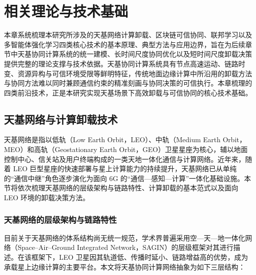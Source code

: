 \chapter{相关理论与技术基础}
\label{chap:ch2_background}

本章系统梳理本研究所涉及的天基网络计算卸载、区块链可信协同、联邦学习以及多智能体强化学习四类核心技术的基本原理、典型方法与应用边界，旨在为后续章节中天基协同计算系统的统一建模、长时间尺度协同优化以及短时间尺度卸载决策提供完整的理论支撑与技术依据。天基协同计算系统具有节点高速运动、链路时变、资源异构与可信环境受限等鲜明特征，传统地面边缘计算中所沿用的卸载方法与协同方法难以同时兼顾通信约束的精准刻画与协同决策的可信执行。本章梳理的四类前沿技术，正是本研究实现天基场景下高效卸载与可信协同的核心技术基础。

\section{天基网络与计算卸载技术}
\label{sec:ch2_satellite_offloading}

天基网络是指以低轨（Low Earth Orbit，LEO）、中轨（Medium Earth Orbit，MEO）和高轨（Geostationary Earth Orbit，GEO）卫星星座为核心，辅以地面控制中心、信关站及用户终端构成的一类天地一体化通信与计算网络。近年来，随着 LEO 巨型星座的快速部署与星上计算能力的持续提升，天基网络已从单纯的“通信中继”角色逐步演化为面向 6G 的“通信—感知—计算”一体化基础设施\cite{He2021,Wu2024ISL,Wang2024NTN,Saad2024NTNRel1718,Mahboob2024AINTN,Wang2025NTN6G}。本节将依次梳理天基网络的层级架构与链路特性、计算卸载的基本范式以及面向 LEO 环境的卸载决策方法。

\subsection{天基网络的层级架构与链路特性}
\label{subsec:ch2_sagin_arch}

目前关于天基网络的体系结构尚无统一规范，学术界普遍采用空—天—地一体化网络（Space–Air–Ground Integrated Network，SAGIN）的层级框架对其进行描述\cite{Wu2024ISL,LMCECN2025,Huang2024ICNLSMC}。在该框架下，LEO 卫星因其轨道低、传播时延小、链路增益高的优势，成为承载星上边缘计算的主要平台\cite{Sun2024MCO,Zhou2024MobilityAware}。本文将天基协同计算网络抽象为如下三层结构：

